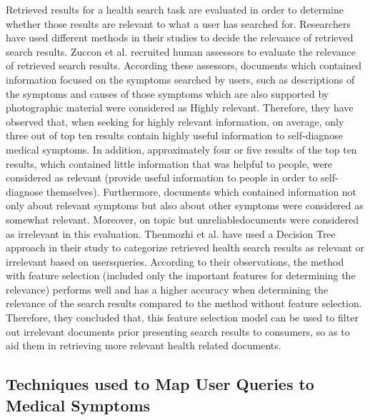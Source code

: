 \documentclass[]{article}
\begin{document}
Retrieved results for a health search task are evaluated in order to determine whether those results are relevant to what a user has searched for. Researchers have used different methods in their studies to decide the relevance of retrieved search results. Zuccon et al. \cite{zuccon2015diagnose} recruited human assessors to evaluate the relevance of retrieved search results. According these assessors, documents which contained information focused on the symptoms searched by users, such as descriptions of the symptoms and causes of those symptoms which are also supported by photographic material were considered as \textquotesingle Highly relevant\textquotesingle. Therefore, they have observed that, when seeking for highly relevant information, on average, only three out of top ten results contain highly useful information to self-diagnose medical symptoms. In addition, approximately four or five results of the top ten results, which contained little information that was helpful to people, were considered as relevant (provide useful information to people in order to self-diagnose themselves). Furthermore, documents which contained information not only about relevant symptoms but also about other symptoms were considered as \textquotesingle somewhat relevant\textquotesingle. Moreover, \textquotesingle on topic but unreliable\textquotesingle documents were considered as irrelevant in this evaluation. Thenmozhi et al. \cite{thenmozhi2016decision} have used a Decision Tree approach in their study to categorize retrieved health search results as relevant or irrelevant based on users\textquotesingle queries. According to their observations, the method with feature selection (included only the important features for determining the relevance) performs well and has a higher accuracy when determining the relevance of the search results compared to the method without feature selection. Therefore, they concluded that, this feature selection model can be used to filter out irrelevant documents prior presenting search results to consumers, so as to aid them in retrieving more relevant health related documents.     

\subsection{Techniques used to Map User Queries to Medical Symptoms}
\end{document}
